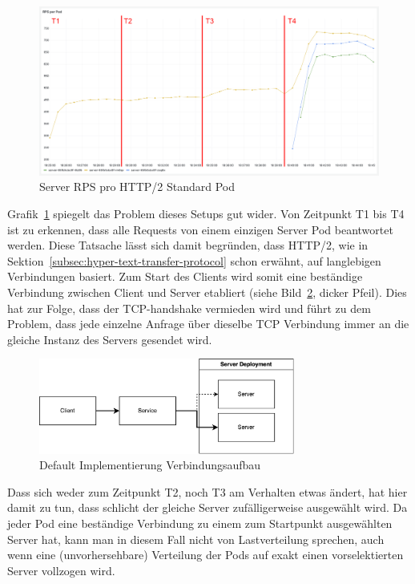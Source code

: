 \begin{figure}[H]
    \centering
    \includegraphics[width=1\textwidth]{img/default_rps}
    \caption{Server RPS pro HTTP/2 Standard Pod}
    \label{fig:default_rps}
\end{figure}

Grafik~\ref{fig:default_rps} spiegelt das Problem dieses Setups gut wider.
Von Zeitpunkt T1 bis T4 ist zu erkennen, dass alle Requests von einem einzigen Server Pod beantwortet werden.
Diese Tatsache lässt sich damit begründen, dass HTTP/2, wie in Sektion~\ref{subsec:hyper-text-transfer-protocol} schon erwähnt, auf langlebigen Verbindungen basiert.
Zum Start des Clients wird somit eine beständige Verbindung zwischen Client und Server etabliert (siehe Bild~\ref{fig:default_loadbalancing}, dicker Pfeil).
Dies hat zur Folge, dass der TCP-handshake vermieden wird und führt zu dem Problem, dass jede einzelne Anfrage über dieselbe TCP Verbindung immer an die gleiche Instanz des Servers gesendet wird.

\begin{figure}[H]
    \centering
    \includegraphics[width=0.75\textwidth]{img/default_loadbalancing}
    \caption{Default Implementierung Verbindungsaufbau}
    \label{fig:default_loadbalancing}
\end{figure}


Dass sich weder zum Zeitpunkt T2, noch T3 am Verhalten etwas ändert, hat hier damit zu tun, dass schlicht der gleiche Server zufälligerweise ausgewählt wird.
Da jeder Pod eine beständige Verbindung zu einem zum Startpunkt ausgewählten Server hat, kann man in diesem Fall nicht von Lastverteilung sprechen, auch wenn eine (unvorhersehbare) Verteilung der Pods auf exakt einen vorselektierten Server vollzogen wird.

